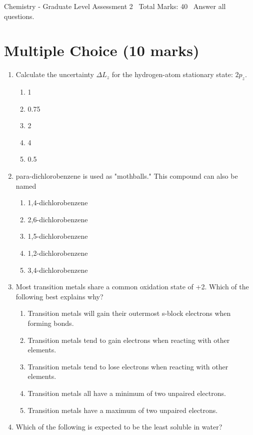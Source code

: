 \documentclass[12pt]{article}
\begin{document}
\begin{center}
Chemistry - Graduate Level Assessment 2 \
Total Marks: 40 \
Answer all questions.
\end{center}

\section*{Multiple Choice (10 marks)}
\begin{enumerate}[label=\arabic*.]
\item Calculate the uncertainty $\Delta L_z$ for the hydrogen-atom stationary state: $2 p_z$.
\begin{enumerate}[label=(\alph*)]
    \item 1
    \item 0.75
    \item 2
    \item 4
    \item 0.5
\end{enumerate}
\item para-dichlorobenzene is used as "mothballs." This compound can also be named
\begin{enumerate}[label=(\alph*)]
    \item 1,4-dichlorobenzene
    \item 2,6-dichlorobenzene
    \item 1,5-dichlorobenzene
    \item 1,2-dichlorobenzene
    \item 3,4-dichlorobenzene
\end{enumerate}
\item Most transition metals share a common oxidation state of +2. Which of the following best
explains why?
\begin{enumerate}[label=(\alph*)]
    \item Transition metals will gain their outermost s-block electrons when forming bonds.
    \item Transition metals tend to gain electrons when reacting with other elements.
    \item Transition metals tend to lose electrons when reacting with other elements.
    \item Transition metals all have a minimum of two unpaired electrons.
    \item Transition metals have a maximum of two unpaired electrons.
\end{enumerate}
\item Which of the following is expected to be the least soluble in water?

\end{enumerate}
\end{document}

